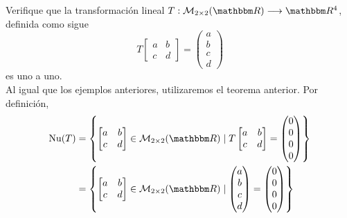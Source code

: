 \begin{example}\label{exam:tlmar4}
    Verifique que la transformación lineal $T:\mathcal{M}_{2 \times 2}(\RR) \longrightarrow \RR[4]$, definida como sigue
    $$T \begin{bmatrix}
        a & b \\
        c & d
    \end{bmatrix} = \begin{pmatrix}
        a \\
        b \\
        c \\
        d
    \end{pmatrix}$$
    es uno a uno. \\
    \solucion Al igual que los ejemplos anteriores, utilizaremos el teorema anterior. Por definición,
    \begin{align*}
        \Nuc(T) & = \left\{ \begin{bmatrix}
            a & b \\
            c & d
        \end{bmatrix} \in \mathcal{M}_{2 \times 2}(\RR) \mid T \begin{bmatrix}
            a & b \\
            c & d
        \end{bmatrix} = \begin{pmatrix}
            0 \\
            0 \\
            0 \\
            0
        \end{pmatrix} \right\} \\
        & = \left\{ \begin{bmatrix}
            a & b \\
            c & d
        \end{bmatrix} \in \mathcal{M}_{2 \times 2}(\RR) \mid \begin{pmatrix}
            a \\
            b \\
            c \\
            d
        \end{pmatrix} = \begin{pmatrix}
            0 \\
            0 \\
            0 \\
            0
        \end{pmatrix} \right\}
    \end{align*}\newpage\noindent

\end{example}
